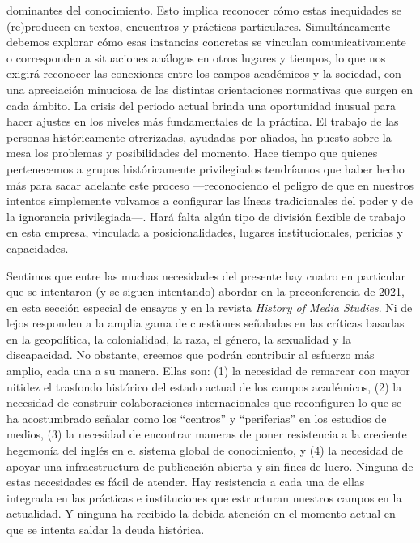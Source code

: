 \documentclass{tufte-handout}
\begin{document}
dominantes del conocimiento. Esto implica reconocer cómo estas
inequidades se (re)producen en textos, encuentros y prácticas
particulares. Simultáneamente debemos explorar cómo esas instancias
concretas se vinculan comunicativamente o corresponden a situaciones
análogas en otros lugares y tiempos, lo que nos exigirá reconocer las
conexiones entre los campos académicos y la sociedad, con una
apreciación minuciosa de las distintas orientaciones normativas que
surgen en cada ámbito. La crisis del periodo actual brinda una
oportunidad inusual para hacer ajustes en los niveles más fundamentales
de la práctica. El trabajo de las personas históricamente otrerizadas,
ayudadas por aliados, ha puesto sobre la mesa los problemas y
posibilidades del momento. Hace tiempo que quienes pertenecemos a grupos
históricamente privilegiados tendríamos que haber hecho más para sacar
adelante este proceso ---reconociendo el peligro de que en nuestros
intentos simplemente volvamos a configurar las líneas tradicionales del
poder y de la ignorancia privilegiada---. Hará falta algún tipo de
división flexible de trabajo en esta empresa, vinculada a
posicionalidades, lugares institucionales, pericias y capacidades.

Sentimos que entre las muchas necesidades del presente hay cuatro en
particular que se intentaron (y se siguen intentando) abordar en la
preconferencia de 2021, en esta sección especial de ensayos y en la
revista \emph{History of Media Studies}. Ni de lejos responden a la
amplia gama de cuestiones señaladas en las críticas basadas en la
geopolítica, la colonialidad, la raza, el género, la sexualidad y la
discapacidad. No obstante, creemos que podrán contribuir al esfuerzo más
amplio, cada una a su manera. Ellas son: (1) la necesidad de remarcar
con mayor nitidez el trasfondo histórico del estado actual de los campos
académicos, (2) la necesidad de construir colaboraciones internacionales
que reconfiguren lo que se ha acostumbrado señalar como los ``centros''
y ``periferias'' en los estudios de medios, (3) la necesidad de
encontrar maneras de poner resistencia a la creciente hegemonía del
inglés en el sistema global de conocimiento, y (4) la necesidad de
apoyar una infraestructura de publicación abierta y sin fines de lucro.
Ninguna de estas necesidades es fácil de atender. Hay resistencia a cada
una de ellas integrada en las prácticas e instituciones que estructuran
nuestros campos en la actualidad. Y ninguna ha recibido la debida
atención en el momento actual en que se intenta saldar la deuda
histórica.
\end{document}
